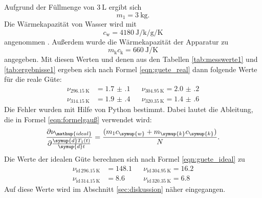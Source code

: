 \documentclass[
  bibliography=totoc,     %
  captions=tableheading,  %
  titlepage=firstiscover, %
]{scrartcl}
\begin{document}
Aufgrund der Füllmenge von $\SI{3}{\liter}$ ergibt sich
\begin{equation}
  m_1 = \SI{3}{\kilo\gram}.
\end{equation}
Die Wärmekapazität von Wasser wird mit
\begin{equation}
  c_\mathup{w} = \SI{4180}{\joule\per\kilo\per\gram\per\kelvin}
\end{equation}
angenommen \cite{dulong}.
Außerdem wurde die Wärmekapazität der Apparatur zu
\begin{equation}
  m_\mathup{k}c_\mathup{k} = \SI{660}{\joule\per\kelvin}
\end{equation}
angegeben.
Mit diesen Werten und denen aus den Tabellen \ref{tab:messwerte1} und \ref{tab:ergebnisse1}
ergeben sich nach Formel \eqref{eqn:guete_real} dann folgende Werte für die reale Güte:
\begin{align}
  \nu_{\SI{296.15}{\kelvin}} &= \num{1.7(1)} & &\nu_{\SI{304.95}{\kelvin}} = \num{2.0(2)}\\
  \nu_{\SI{314.15}{\kelvin}} &= \num{1.9(4)} & &\nu_{\SI{320.35}{\kelvin}} = \num{1.4(6)}
\end{align}
Die Fehler wurden mit Hilfe von Python bestimmt.
Dabei lautet die Ableitung, die in Formel \eqref{eqn:formelgauß} verwendet wird:
\begin{equation}
  \frac{\partial \nu_\mathup{ideal}}{\partial \frac{\symup{d} T_1 \left( t \right)}{\symup{d} t}} = \frac{(m_1c_\symup{w}+m_\symup{k}c_\symup{k})}{N}.
\end{equation}
Die Werte der idealen Güte berechnen sich nach Formel \eqref{eqn:guete_ideal} zu
\begin{align}
  \nu_{\text{id}\,\SI{296.15}{\kelvin}} &= \num{148.1} & &\nu_{\text{id}\,\SI{304.95}{\kelvin}} = \num{16.2}\\
  \nu_{\text{id}\,\SI{314.15}{\kelvin}} &= \num{8.6} & &\nu_{\text{id}\,\SI{320.35}{\kelvin}} = \num{6.8}
\end{align}
Auf diese Werte wird im Abschnitt \ref{sec:diskussion} näher eingegangen.
\clearpage
\end{document}
